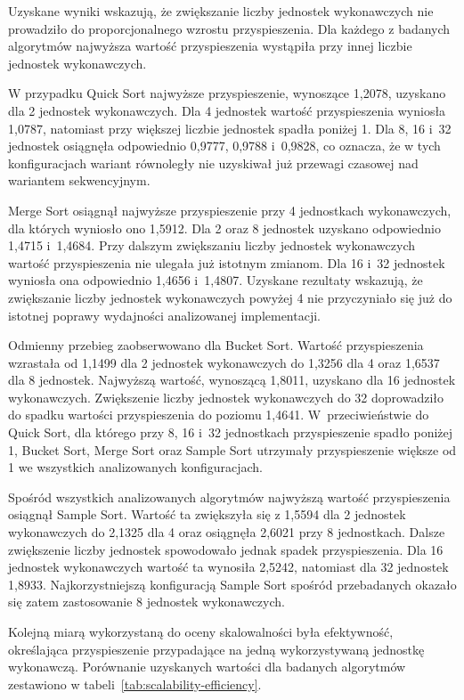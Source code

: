 Uzyskane wyniki wskazują, że zwiększanie liczby jednostek wykonawczych nie prowadziło do proporcjonalnego wzrostu przyspieszenia.
Dla każdego z badanych algorytmów najwyższa wartość przyspieszenia wystąpiła przy innej liczbie jednostek wykonawczych.

W przypadku Quick Sort najwyższe przyspieszenie, wynoszące 1,2078, uzyskano dla 2 jednostek wykonawczych. 
Dla 4 jednostek wartość przyspieszenia wyniosła 1,0787, natomiast przy większej liczbie jednostek spadła poniżej 1.
Dla 8, 16 i~32 jednostek osiągnęła odpowiednio 0,9777, 0,9788 i~0,9828, co oznacza,
że w tych konfiguracjach wariant równoległy nie uzyskiwał już przewagi czasowej nad wariantem sekwencyjnym.

Merge Sort osiągnął najwyższe przyspieszenie przy 4 jednostkach wykonawczych, dla których wyniosło ono 1,5912. 
Dla 2 oraz 8 jednostek uzyskano odpowiednio 1,4715 i~1,4684. 
Przy dalszym zwiększaniu liczby jednostek wykonawczych wartość przyspieszenia nie ulegała już istotnym zmianom.
Dla 16 i~32 jednostek wyniosła ona odpowiednio 1,4656 i~1,4807.
Uzyskane rezultaty wskazują, że zwiększanie liczby jednostek wykonawczych powyżej 4 nie przyczyniało się 
już do istotnej poprawy wydajności analizowanej implementacji.

Odmienny przebieg zaobserwowano dla Bucket Sort. 
Wartość przyspieszenia wzrastała od 1,1499 dla 2 jednostek wykonawczych do 1,3256 dla 4 oraz 1,6537 dla 8 jednostek.
Najwyższą wartość, wynoszącą 1,8011, uzyskano dla 16 jednostek wykonawczych.
Zwiększenie liczby jednostek wykonawczych do 32 doprowadziło do spadku wartości przyspieszenia do poziomu 1,4641.
W~przeciwieństwie do Quick Sort, dla którego przy 8, 16 i~32 jednostkach przyspieszenie spadło poniżej 1, 
Bucket Sort, Merge Sort oraz Sample Sort utrzymały przyspieszenie większe od 1 we wszystkich analizowanych konfiguracjach.

Spośród wszystkich analizowanych algorytmów najwyższą wartość przyspieszenia osiągnął Sample Sort.
Wartość ta zwiększyła się z 1,5594 dla 2 jednostek wykonawczych do 2,1325 dla 4 oraz osiągnęła 2,6021 przy 8 jednostkach.
Dalsze zwiększenie liczby jednostek spowodowało jednak spadek przyspieszenia.
Dla 16 jednostek wykonawczych wartość ta wynosiła 2,5242, natomiast dla 32 jednostek 1,8933.
Najkorzystniejszą konfiguracją Sample Sort spośród przebadanych okazało się zatem zastosowanie 8 jednostek wykonawczych.

Kolejną miarą wykorzystaną do oceny skalowalności była efektywność,
określająca przyspieszenie przypadające na jedną wykorzystywaną jednostkę wykonawczą.
Porównanie uzyskanych wartości dla badanych algorytmów zestawiono w tabeli~\ref{tab:scalability-efficiency}.

